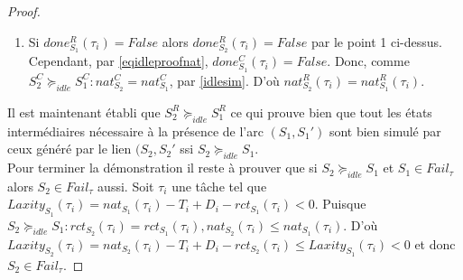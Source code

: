 \documentclass[a4paper]{report}
\theoremstyle{break}
\theoremstyle{breakplain}
\begin{document}
\begin{proof}
\begin{enumerate}[label=(\alph*)]
\item Si $done_{S_1}^R(\tau_i) = False$ alors $done_{S_2}^R(\tau_i) = False$ par le point 1 ci-dessus. Cependant, par \eqref{eqidleproofnat}, $done_{S_1}^C(\tau_i) = False$. Donc, comme $S^C_2 \succeq_{idle} S^C_1 : nat_{S_2}^C = nat_{S_1}^C$, par \autoref{idlesim}. D'où $nat_{S_2}^R(\tau_i) = nat_{S_1}^R(\tau_i)$.
\end{enumerate}
Il est maintenant établi que $S^R_2 \succeq_{idle} S^R_1$ ce qui prouve bien que tout les états intermédiaires nécessaire à la présence de l'arc $(S_1, S_1')$ sont bien simulé par ceux généré par le lien $(S_2, S_2'$ ssi $S_2 \succeq_{idle} S_1$.\\

Pour terminer la démonstration il reste à prouver que si $S_2 \succeq_{idle} S_1$ et $S_1 \in Fail_\tau$ alors $S_2 \in Fail_\tau$ aussi. Soit $\tau_i$ une tâche tel que $Laxity_{S_1}(\tau_i) = nat_{S_1}(\tau_i) -T_i + D_i - rct_{S_1}(\tau_i) < 0$. Puisque $S_2 \succeq_{idle} S_1 : rct_{S_2}(\tau_i) = rct_{S_1}(\tau_i), nat_{S_2}(\tau_i) \leq nat_{S_1}(\tau_i)$. D'où $Laxity_{S_2}(\tau_i) = nat_{S_2}(\tau_i) -T_i + D_i - rct_{S_2}(\tau_i) \leq Laxity_{S_1}(\tau_i) < 0$ et donc $S_2 \in Fail_\tau$.

\end{proof}



%

\end{document}
